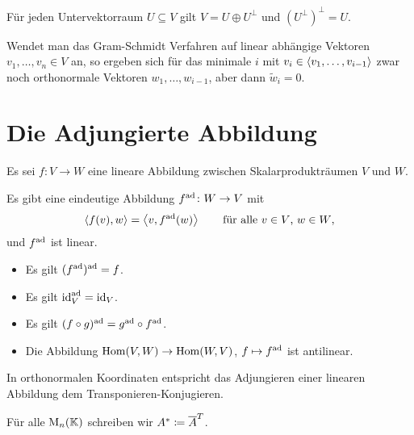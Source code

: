 \begin{corollary}
  Für jeden Untervektorraum $U \subseteq V$ gilt $V = U \oplus U^\perp$ und $(U^\perp)^\perp = U$.
\end{corollary}

\begin{remark}
  Wendet man das Gram-Schmidt Verfahren auf linear abhängige Vektoren $v_1, \dotsc, v_n \in V$ an, so ergeben sich für das minimale $i$ mit $v_i \in \left\langle v_1, \dotsc, v_{i-1} \right\rangle$ zwar noch orthonormale Vektoren $w_1, \dotsc, w_{i-1}$, aber dann $\tilde{w}_i = 0$.
\end{remark}






\section{Die Adjungierte Abbildung}
\label{section: adjoint map for scalar products}

Es sei $f \colon V \to W$ eine lineare Abbildung zwischen Skalarprodukträumen $V$ und $W$.

\begin{proposition}
  Es gibt eine eindeutige Abbildung $f^{\operatorname{ad}} \colon W \to V$ mit
  \begin{equation}
    \label{equation: definition of the adjoint map by elements for scalar products}
      \left\langle f(v), w \right\rangle
    = \left\langle v, f^{\operatorname{ad}}(w) \right\rangle
    \qquad
    \text{für alle $v \in V$, $w \in W$},
  \end{equation}
  und $f^{\operatorname{ad}}$ ist linear.
\end{proposition}

\begin{lemma}
  \begin{itemize}
    \item
      Es gilt $(f^{\operatorname{ad}})^{\operatorname{ad}} = f$.
    \item
      Es gilt $\operatorname{id}_V^{\operatorname{ad}} = \operatorname{id}_V$.
    \item
      Es gilt $(f \circ g)^{\operatorname{ad}} = g^{\operatorname{ad}} \circ f^{\operatorname{ad}}$.
    \item
      Die Abbildung $\operatorname{Hom}(V, W) \to \operatorname{Hom}(W, V)$, $f \mapsto f^{\operatorname{ad}}$ ist antilinear.
  \end{itemize}
\end{lemma}

In orthonormalen Koordinaten entspricht das Adjungieren einer linearen Abbildung dem Transponieren-Konjugieren.

\begin{notation}
  Für alle $\operatorname{M}_{n}(\mathbb{K})$ schreiben wir $A^* \coloneqq \overline{A}^T$.
\end{notation}

